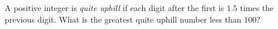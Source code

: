 A positive integer is \emph{quite uphill} if each digit after the first is $1.5$ times the previous digit. What is the greatest quite uphill number less than $100$?
